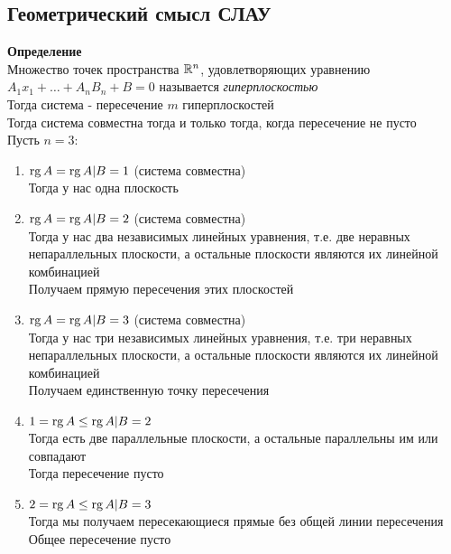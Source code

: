 \documentclass[12pt]{article}
\begin{document}
\subsection{Геометрический смысл СЛАУ}
\textbf{Определение}\\
Множество точек пространства $\mathbb{R}^n$, удовлетворяющих уравнению $A_1x_1+\ldots+A_nB_n+B=0$ называется \textit{гиперплоскостью}\\
Тогда система - пересечение $m$ гиперплоскостей\\
Тогда система совместна тогда и только тогда, когда пересечение не пусто\\
Пусть $n = 3$:
\begin{enumerate}
    \item $\operatorname{rg} A = \operatorname{rg} A|B = 1$ (система совместна)\\
    Тогда у нас одна плоскость
    \item $\operatorname{rg} A = \operatorname{rg} A|B = 2$ (система совместна)\\
    Тогда у нас два независимых линейных уравнения, т.е. две неравных непараллельных плоскости, а остальные плоскости являются их линейной комбинацией\\
    Получаем прямую пересечения этих плоскостей
    \item $\operatorname{rg} A = \operatorname{rg} A|B = 3$ (система совместна)\\
    Тогда у нас три независимых линейных уравнения, т.е. три неравных непараллельных плоскости, а остальные плоскости являются их линейной комбинацией\\
    Получаем единственную точку пересечения
    \item $1 = \operatorname{rg} A \leq \operatorname{rg} A|B = 2$\\
    Тогда есть две параллельные плоскости, а остальные параллельны им или совпадают\\
    Тогда пересечение пусто
    \item $2 = \operatorname{rg} A \leq \operatorname{rg} A|B = 3$\\
    Тогда мы получаем пересекающиеся прямые без общей линии пересечения\\
    Общее пересечение пусто\\
\end{enumerate}
\end{document}
